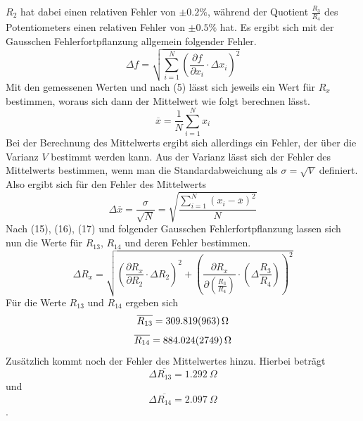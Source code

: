 $R_2$ hat dabei einen relativen Fehler von $\pm 0.2 \%$, während der Quotient $\frac{R_\text{3}}{R_\text{4}}$ des Potentiometers einen relativen Fehler von $\pm 0.5 \%$ hat.
Es ergibt sich mit der Gausschen Fehlerfortpflanzung allgemein folgender Fehler.
\begin{equation}
    \Delta f = \sqrt{\sum \limits_{i=1}^{N} \left (\frac{\partial f}{\partial x_i} \cdot \Delta x_i \right)^2}
\end{equation}
Mit den gemessenen Werten und nach (5) lässt sich jeweils ein Wert für $R_x$ bestimmen, woraus sich dann der Mittelwert wie folgt berechnen lässt.
\begin{equation}
    \overline{x} = \frac{1}{N} \sum_{i=1}^N x_i
\end{equation}
Bei der Berechnung des Mittelwerts ergibt sich allerdings ein Fehler, der über die Varianz $V$ bestimmt werden kann.
Aus der Varianz lässt sich der Fehler des Mittelwerts bestimmen, wenn man die Standardabweichung als $\sigma = \sqrt{V}$ definiert.
Also ergibt sich für den Fehler des Mittelwerts
\begin{equation}
    \Delta \overline{x} = \frac{\sigma}{\sqrt{N}} = \sqrt{\frac{\sum \limits_{i=1}^N (x_i-\overline{x})^2}{N}}
\end{equation}
Nach (15), (16), (17) und folgender Gausschen Fehlerfortpflanzung lassen sich nun die Werte für $R_\text{13}$, $R_\text{14}$ und deren Fehler bestimmen.
\begin{equation}
    \Delta R_x = \sqrt{\left (\frac{\partial R_x}{\partial R_2}\cdot \Delta R_2 \right )^2 + \left (\frac{\partial R_x}{\partial \left (\frac{R_3}{R_4}\right )} \cdot \left (\Delta \frac{R_3}{R_4}\right )\right )^2}
\end{equation}
Für die Werte $R_\text{13}$ und $R_\text{14}$ ergeben sich
\begin{equation}
    \overline{R_\text{13}} = \SI{309,819 \pm 0,963}{\Omega} \notag %
\end{equation} 
\begin{equation}
    \overline{R_\text{14}} = \SI{884,024 \pm 2,749}{\Omega}\notag
\end{equation}
Zusätzlich kommt noch der Fehler des Mittelwertes hinzu.
Hierbei beträgt \\
\begin{equation*}
    \Delta \overline{R_\text{13}} = \SI{1,292}{\Omega}
\end{equation*}
und
\begin{equation*}
    \Delta \overline{R_\text{14}} = \SI{2,097}{\Omega}
\end{equation*}.


